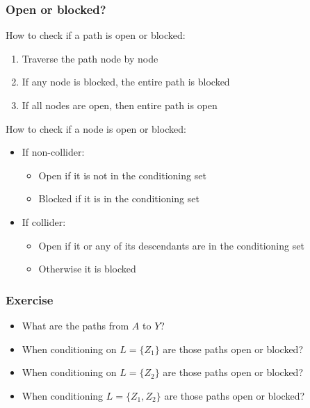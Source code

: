 \documentclass{beamer}
\begin{document}
\begin{frame}
\frametitle{Open or blocked?}

How to check if a path is open or blocked:
\begin{enumerate}
    \item Traverse the path node by node \pause 
    \item If any node is blocked, the entire path is blocked
    \item If all nodes are open, then entire path is open
\end{enumerate}

\pause 
\vspace{2em}

How to check if a node is open or blocked:
\begin{itemize}
    \item If non-collider:
    \begin{itemize}
        \item Open if it is not in the conditioning set
        \item Blocked if it is in the conditioning set
    \end{itemize} \pause
    \item If collider:
    \begin{itemize}
        \item Open if it or any of its descendants are in the conditioning set
        \item Otherwise it is blocked
    \end{itemize} \pause
\end{itemize}

\end{frame}




\begin{frame}
\frametitle{Exercise}

\begin{figure}
\end{figure}

\begin{itemize}
    \item What are the paths from $A$ to $Y$?
    \item When conditioning on $L = \{Z_1\}$ are those paths open or blocked?
    \item When conditioning on $L = \{Z_2\}$ are those paths open or blocked?
    \item When conditioning $L = \{Z_1, Z_2\}$ are those paths open or blocked?
\end{itemize}

\end{frame}
\end{document}
